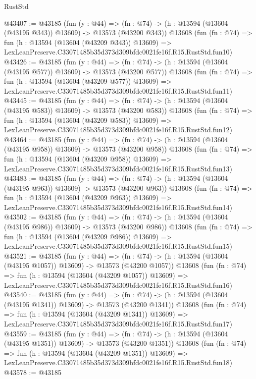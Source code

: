 \begin{lexlean}{RustStd}
\begin{coremodule}
@43407 := @43185
    (fun (y : @44) =>
    (fn : @74) -> (h : @13594 (@13604 (@43195 @343)) @13609) -> @13573 (@43200 @343))
    @13608
    (fun (fn : @74) =>
    fun (h : @13594 (@13604 (@43209 @343)) @13609) =>
    LexLeanPreserve.C33071485b35d373d309bfdc0021fe16f.R15.RustStd.fun10)
@43426 := @43185
    (fun (y : @44) =>
    (fn : @74) -> (h : @13594 (@13604 (@43195 @577)) @13609) -> @13573 (@43200 @577))
    @13608
    (fun (fn : @74) =>
    fun (h : @13594 (@13604 (@43209 @577)) @13609) =>
    LexLeanPreserve.C33071485b35d373d309bfdc0021fe16f.R15.RustStd.fun11)
@43445 := @43185
    (fun (y : @44) =>
    (fn : @74) -> (h : @13594 (@13604 (@43195 @583)) @13609) -> @13573 (@43200 @583))
    @13608
    (fun (fn : @74) =>
    fun (h : @13594 (@13604 (@43209 @583)) @13609) =>
    LexLeanPreserve.C33071485b35d373d309bfdc0021fe16f.R15.RustStd.fun12)
@43464 := @43185
    (fun (y : @44) =>
    (fn : @74) -> (h : @13594 (@13604 (@43195 @958)) @13609) -> @13573 (@43200 @958))
    @13608
    (fun (fn : @74) =>
    fun (h : @13594 (@13604 (@43209 @958)) @13609) =>
    LexLeanPreserve.C33071485b35d373d309bfdc0021fe16f.R15.RustStd.fun13)
@43483 := @43185
    (fun (y : @44) =>
    (fn : @74) -> (h : @13594 (@13604 (@43195 @963)) @13609) -> @13573 (@43200 @963))
    @13608
    (fun (fn : @74) =>
    fun (h : @13594 (@13604 (@43209 @963)) @13609) =>
    LexLeanPreserve.C33071485b35d373d309bfdc0021fe16f.R15.RustStd.fun14)
@43502 := @43185
    (fun (y : @44) =>
    (fn : @74) -> (h : @13594 (@13604 (@43195 @986)) @13609) -> @13573 (@43200 @986))
    @13608
    (fun (fn : @74) =>
    fun (h : @13594 (@13604 (@43209 @986)) @13609) =>
    LexLeanPreserve.C33071485b35d373d309bfdc0021fe16f.R15.RustStd.fun15)
@43521 := @43185
    (fun (y : @44) =>
    (fn : @74) -> (h : @13594 (@13604 (@43195 @1057)) @13609) -> @13573 (@43200 @1057))
    @13608
    (fun (fn : @74) =>
    fun (h : @13594 (@13604 (@43209 @1057)) @13609) =>
    LexLeanPreserve.C33071485b35d373d309bfdc0021fe16f.R15.RustStd.fun16)
@43540 := @43185
    (fun (y : @44) =>
    (fn : @74) -> (h : @13594 (@13604 (@43195 @1341)) @13609) -> @13573 (@43200 @1341))
    @13608
    (fun (fn : @74) =>
    fun (h : @13594 (@13604 (@43209 @1341)) @13609) =>
    LexLeanPreserve.C33071485b35d373d309bfdc0021fe16f.R15.RustStd.fun17)
@43559 := @43185
    (fun (y : @44) =>
    (fn : @74) -> (h : @13594 (@13604 (@43195 @1351)) @13609) -> @13573 (@43200 @1351))
    @13608
    (fun (fn : @74) =>
    fun (h : @13594 (@13604 (@43209 @1351)) @13609) =>
    LexLeanPreserve.C33071485b35d373d309bfdc0021fe16f.R15.RustStd.fun18)
@43578 := @43185

\end{coremodule}
\end{lexlean}
